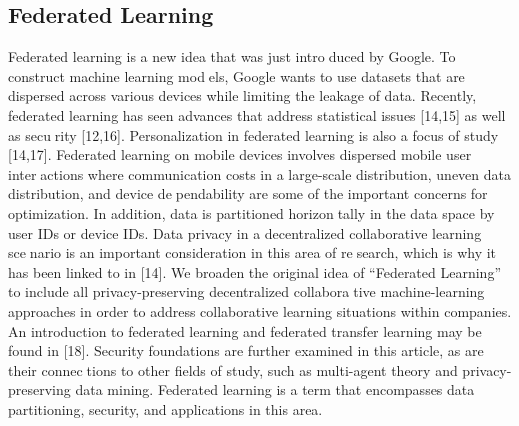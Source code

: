\documentclass[openacc]{rsproca_new}%
\begin{document}
\subsection{Federated Learning}
Federated learning is a new idea that was just introduced by Google. To construct machine learning models, Google wants to use datasets that are dispersed
across various devices while limiting the leakage of
data. Recently, federated learning has seen advances
that address statistical issues [14,15] as well as security [12,16]. Personalization in federated learning is
also a focus of study [14,17]. Federated learning on
mobile devices involves dispersed mobile user interactions where communication costs in a large-scale
distribution, uneven data distribution, and device dependability are some of the important concerns for
optimization. In addition, data is partitioned horizontally in the data space by user IDs or device IDs. Data
privacy in a decentralized collaborative learning scenario is an important consideration in this area of research, which is why it has been linked to in [14]. We
broaden the original idea of “Federated Learning” to
include all privacy-preserving decentralized collaborative machine-learning approaches in order to address
collaborative learning situations within companies. An
introduction to federated learning and federated transfer
learning may be found in [18]. Security foundations
are further examined in this article, as are their connections to other fields of study, such as multi-agent theory
and privacy-preserving data mining. Federated learning
is a term that encompasses data partitioning, security,
and applications in this area. 
\end{document}

